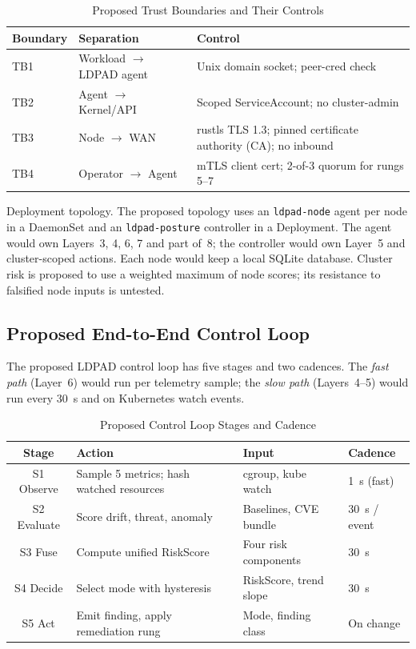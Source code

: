 \documentclass{ieeeaccess}
\renewcommand{\textbf}[1]{#1}
\begin{document}
\begin{table}[ht]
\caption{Proposed Trust Boundaries and Their Controls}
\label{tab:trust}
\centering
\setlength{\tabcolsep}{3pt}
\begin{tabular}{|p{40pt}|p{52pt}|p{62pt}|}
\hline
\textbf{Boundary} & \textbf{Separation} & \textbf{Control} \\
\hline
TB1 & Workload $\rightarrow$ LDPAD agent & Unix domain socket; peer-cred check \\
\hline
TB2 & Agent $\rightarrow$ Kernel/API & Scoped ServiceAccount; no cluster-admin \\
\hline
TB3 & Node $\rightarrow$ WAN & rustls TLS 1.3; pinned certificate authority (CA); no inbound \\
\hline
TB4 & Operator $\rightarrow$ Agent & mTLS client cert; 2-of-3 quorum for rungs 5--7 \\
\hline
\end{tabular}
\end{table}

\noindent\textbf{Deployment topology.} The proposed topology uses an \texttt{ldpad-}\allowbreak\texttt{node} agent per node in a DaemonSet and an \texttt{ldpad-}\allowbreak\texttt{posture} controller in a Deployment. The agent would own Layers~3, 4, 6, 7 and part of~8; the controller would own Layer~5 and cluster-scoped actions. Each node would keep a local SQLite database. Cluster risk is proposed to use a weighted maximum of node scores; its resistance to falsified node inputs is untested.

\subsection{Proposed End-to-End Control Loop}
\label{subsec:loop}

The proposed LDPAD control loop has five stages and two cadences. The \emph{fast path} (Layer~6) would run per telemetry sample; the \emph{slow path} (Layers~4--5) would run every 30~s and on Kubernetes watch events.

\begin{table}[ht]
\caption{Proposed Control Loop Stages and Cadence}
\label{tab:loop}
\centering
\setlength{\tabcolsep}{3pt}
\begin{tabular}{|c|p{42pt}|p{52pt}|p{38pt}|}
\hline
\textbf{Stage} & \textbf{Action} & \textbf{Input} & \textbf{Cadence} \\
\hline
S1 Observe & Sample 5 metrics; hash watched resources & cgroup, kube watch & 1~s (fast) \\
\hline
S2 Evaluate & Score drift, threat, anomaly & Baselines, CVE bundle & 30~s / event \\
\hline
S3 Fuse & Compute unified RiskScore & Four risk components & 30~s \\
\hline
S4 Decide & Select mode with hysteresis & RiskScore, trend slope & 30~s \\
\hline
S5 Act & Emit finding, apply remediation rung & Mode, finding class & On change \\
\hline
\end{tabular}
\end{table}
\end{document}
